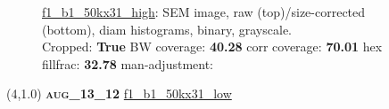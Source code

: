 \begin{figure}[h!]
\label{semimg8}
\caption*{\hyperlink{covtableaug_13_12}{\color{blue} \small \ttfamily f1\_b1\_50kx31\_high}: SEM image, raw (top)/size-corrected (bottom), diam histograms, binary, grayscale.\\Cropped: {\bf True} \;\; BW coverage: {\bf 40.28} \:\: corr coverage: {\bf 70.01} \:\: hex fillfrac: {\bf 32.78} \:\: man-adjustment: {\bf \color{blue}{Yes}}}
\end{figure}
\newpage

\begin{textblock}{5}(4,1.0)
{\bf \textsc{aug\_13\_12}}
\hspace{4.5cm}
\hyperlink{covtableaug_13_12}{\color{blue} \large \ttfamily f1\_b1\_50kx31\_low}
\end{textblock}


